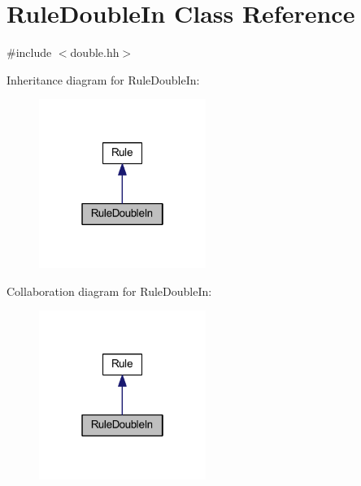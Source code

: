 \hypertarget{class_rule_double_in}{}\section{Rule\+Double\+In Class Reference}
\label{class_rule_double_in}


{\ttfamily \#include $<$double.\+hh$>$}



Inheritance diagram for Rule\+Double\+In\+:
\nopagebreak
\begin{figure}[H]
\begin{center}
\leavevmode
\includegraphics[width=154pt]{class_rule_double_in__inherit__graph}
\end{center}
\end{figure}


Collaboration diagram for Rule\+Double\+In\+:
\nopagebreak
\begin{figure}[H]
\begin{center}
\leavevmode
\includegraphics[width=154pt]{class_rule_double_in__coll__graph}
\end{center}
\end{figure}
